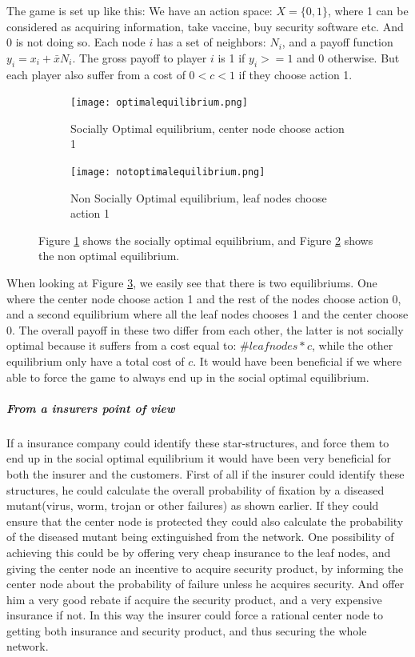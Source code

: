 The game is set up like this:
We have an action space: $X=\{0,1\}$, where 1 can be considered as acquiring information, take vaccine, buy security software etc. And 0 is not doing so.
Each node $i$ has a set of neighbors: $N_{i} $, and a payoff function $y_{i}=x_{i}+\bar{x}N_{i}$. 
The gross payoff to player $i$ is 1 if $y_{i}>=1$ and 0 otherwise. But each player also suffer from a cost of $0<c<1$ if they choose action 1.
\begin{figure}[h]
\centering
\begin{subfigure}{.4\textwidth}
  \centering
  \texttt{[image: optimalequilibrium.png]}
  \caption{\label{fig:optequi} Socially Optimal equilibrium, center node choose action 1}
\end{subfigure}
\quad
\begin{subfigure}{.4\textwidth}
  \centering
  \texttt{[image: notoptimalequilibrium.png]}
  \caption{\label{fig:notoptequi} Non Socially Optimal equilibrium, leaf nodes choose action 1}
\end{subfigure}
\caption{\label{fig:starequi} Figure \ref{fig:optequi} shows the socially optimal equilibrium, and Figure \ref{fig:notoptequi} shows the non optimal equilibrium.}

\end{figure}
When looking at Figure \ref{fig:starequi}, we easily see that there is two equilibriums. One where the center node choose action 1 and the rest of the nodes choose action 0, and a second equilibrium where all the leaf nodes chooses 1 and the center choose 0.
The overall payoff in these two differ from each other, the latter is not socially optimal because it
 suffers from a cost equal to: $\#leaf nodes*c$, while the other equilibrium only have a total cost of $c$.
 It would have been beneficial if we where able to force the game to always end up in the social optimal equilibrium.


\subparagraph{From a insurers point of view}
If a insurance company could identify these star-structures, and force them to end up in the social optimal equilibrium it would have been very beneficial for both the insurer and the customers.
First of all if the insurer could identify these structures, he could calculate the overall probability of fixation by a diseased mutant(virus, worm, trojan or other failures) as shown earlier. If they could ensure that the center node is protected they could also calculate the probability of the diseased mutant being extinguished from the network.
One possibility of achieving this could be by offering very cheap insurance to the leaf nodes, and giving the center node an incentive to acquire security product, by informing the center node about the probability of failure unless he acquires security. And offer him a very good rebate if acquire the security product, and a very expensive insurance if not. In this way the insurer could force a rational center node to getting both insurance and security product, and thus securing the whole network.

